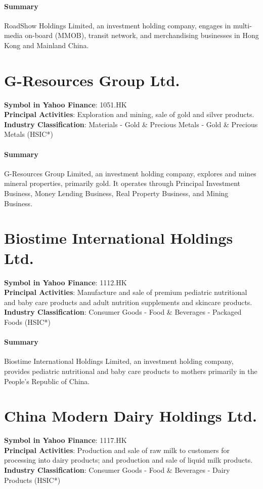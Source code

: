 \paragraph{Summary}
RoadShow Holdings Limited, an investment holding company, engages in multi-media on-board (MMOB), transit network, and merchandising businesses in Hong Kong and Mainland China.


\section{G-Resources Group Ltd.}
\textbf{Symbol in Yahoo Finance}: 1051.HK\\
\textbf{Principal Activities}: Exploration and mining, sale of gold and silver products.\\
\textbf{Industry Classification}: Materials - Gold \& Precious Metals - Gold \& Precious Metals (HSIC*)
\paragraph{Summary}
G-Resources Group Limited, an investment holding company, explores and mines mineral properties, primarily gold. It operates through Principal Investment Business, Money Lending Business, Real Property Business, and Mining Business.


\section{Biostime International Holdings Ltd.}
\textbf{Symbol in Yahoo Finance}: 1112.HK\\
\textbf{Principal Activities}: Manufacture and sale of premium pediatric nutritional and baby care products and adult nutrition supplements and skincare products.\\
\textbf{Industry Classification}: Consumer Goods - Food \& Beverages - Packaged Foods (HSIC*)
\paragraph{Summary}
Biostime International Holdings Limited, an investment holding company, provides pediatric nutritional and baby care products to mothers primarily in the People's Republic of China.


\section{China Modern Dairy Holdings Ltd.}
\textbf{Symbol in Yahoo Finance}: 1117.HK\\
\textbf{Principal Activities}: Production and sale of raw milk to customers for processing into dairy products; and production and sale of liquid milk products.\\
\textbf{Industry Classification}: Consumer Goods - Food \& Beverages - Dairy Products (HSIC*)
